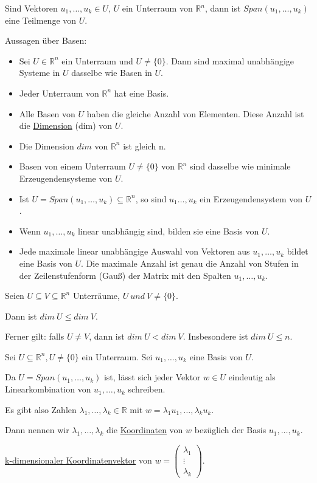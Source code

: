 \documentclass{mg2}
\begin{document}
\begin{lemma}
Sind Vektoren $u_1,\dots,u_k \in U$, $U$ ein Unterraum von $\mathbb{R}^n$, dann ist $Span(u_1,\dots,u_k)$ eine Teilmenge von $U$.
\end{lemma}

Aussagen über Basen:
\begin{itemize}
\item Sei $U \in \mathbb{R}^n$ ein Unterraum und $U \neq \{0\}$. Dann sind maximal unabhängige Systeme in $U$ dasselbe wie Basen in $U$.
\item Jeder Unterraum von $\mathbb{R}^n$ hat eine Basis.
\item Alle Basen von $U$ haben die gleiche Anzahl von Elementen. Diese Anzahl ist die \underline{Dimension} (dim) von $U$.
\item Die Dimension $dim$ von $\mathbb{R}^n$ ist gleich n.
\item Basen von einem Unterraum $U \neq \{0\}$ von $\mathbb{R}^n$ sind dasselbe wie minimale Erzeugendensysteme von $U$.
\item Ist $U = Span(u_1,\dots,u_k) \subseteq \mathbb{R}^n$, so sind $u_1\dots,u_k$ ein Erzeugendensystem von $U$.
\item Wenn $u_1, \dots, u_k$ linear unabhängig sind, bilden sie eine Basis von $U$.
\item Jede maximale linear unabhängige Auswahl von Vektoren aus $u_1,\dots,u_k$ bildet eine Basis von $U$. Die maximale Anzahl ist genau die Anzahl von Stufen in der Zeilenstufenform (Gauß) der Matrix mit den Spalten $u_1,\dots,u_k$.
\end{itemize}

\begin{beobachtung}
Seien $U \subseteq V \subseteq \mathbb{R}^n$ Unterräume, $U~und~V \neq \{0\}$.

Dann ist $dim~U \leq dim~V$.

Ferner gilt: falls $U \neq V$, dann ist $dim~U < dim~V$. Insbesondere ist $dim~U \leq n$.
\end{beobachtung}

\begin{definition}
Sei $U \subseteq \mathbb{R}^n, U \neq \{0\}$ ein Unterraum. Sei $u_1,\dots,u_k$ eine Basis von $U$.

Da $U = Span(u_1,\dots,u_k)$ ist, lässt sich jeder Vektor $w \in U$ eindeutig als Linearkombination von $u_1,\dots,u_k$ schreiben.

Es gibt also Zahlen $\lambda_1,\dots,\lambda_k \in \mathbb{R}$ mit $w = \lambda_1 u_1,\dots,\lambda_k u_k$.

Dann nennen wir $\lambda_1,\dots,\lambda_k$ die \underline{Koordinaten} von $w$ bezüglich der Basis $u_1,\dots,u_k$.

 \underline{k-dimensionaler Koordinatenvektor} von $w = \begin{pmatrix}\lambda_1\\\vdots\\\lambda_k\end{pmatrix}$.
\end{definition}
\end{document}
